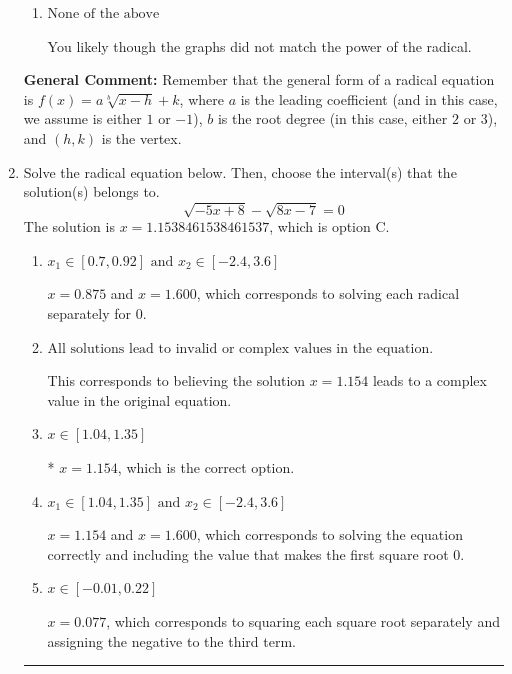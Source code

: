 \documentclass{extbook}[14pt]
\newcommand{\litem}[1]{\item #1

\rule{\textwidth}{0.4pt}}
\begin{document}
\begin{enumerate}
{\begin{enumerate}[label=\Alph*.]
* This is the correct option.
\item \( \text{None of the above} \)

You likely though the graphs did not match the power of the radical.
\end{enumerate}

\textbf{General Comment:} Remember that the general form of a radical equation is $ f(x) = a \sqrt[b]{x - h} + k$, where $a$ is the leading coefficient (and in this case, we assume is either $1$ or $-1$), $b$ is the root degree (in this case, either $2$ or $3$), and $(h, k)$ is the vertex.
}
\litem{
Solve the radical equation below. Then, choose the interval(s) that the solution(s) belongs to.
\[ \sqrt{-5 x + 8} - \sqrt{8 x - 7} = 0 \]
The solution is \( x = 1.1538461538461537 \), which is option C.\begin{enumerate}[label=\Alph*.]
\item \( x_1 \in [0.7, 0.92] \text{ and } x_2 \in [-2.4,3.6] \)

$x = 0.875$ and $x = 1.600$, which corresponds to solving each radical separately for 0.
\item \( \text{All solutions lead to invalid or complex values in the equation.} \)

This corresponds to believing the solution $x = 1.154$ leads to a complex value in the original equation.
\item \( x \in [1.04,1.35] \)

* $x = 1.154$, which is the correct option.
\item \( x_1 \in [1.04, 1.35] \text{ and } x_2 \in [-2.4,3.6] \)

$x = 1.154$ and $x = 1.600$, which corresponds to solving the equation correctly and including the value that makes the first square root 0.
\item \( x \in [-0.01,0.22] \)

$x = 0.077$, which corresponds to squaring each square root separately and assigning the negative to the third term.
\end{enumerate}

}
\end{enumerate}
\end{document}

